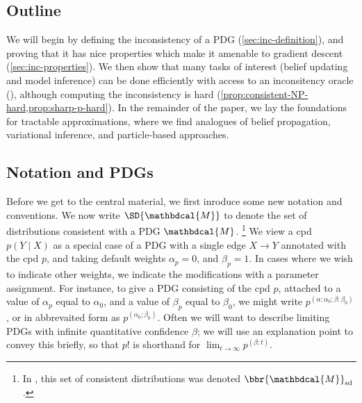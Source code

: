 \documentclass{article}
\theoremstyle{plain}
\theoremstyle{definition}
\theoremstyle{remark}
\newcommand{\dg}[1]{\mathbdcal{#1}}
\begin{document}



\subsection*{Outline}
We will begin by defining the inconsistency of a PDG (\cref{sec:inc-definition}), and proving that it has nice properties which make it amenable to gradient descent (\cref{sec:inc-properties}). We then show that many tasks of interest (belief updating and model inference) can be done efficiently with access to an inconsitency oracle (), although computing the inconsistency is hard (\cref{prop:consistent-NP-hard,prop:sharp-p-hard}).
In the remainder of the paper, we lay the foundations for tractable approximations, where we find analogues of belief propagation, variational inference, and particle-based approaches.


\subsection*{Notation and PDGs}


\begin{defn}
	
\end{defn}


Before we get to the central material, we first inroduce some new notation and conventions. We now write $\SD{\dg M}$ to denote
the set of distributions consistent with a PDG $\dg M$.%
	\footnote{In \cite{richardson2020probabilistic}, this set of consistent distributions was denoted $\bbr{\dg M}_{\textrm{sd}}$.}
We view a cpd $p(Y \mid X)$ as a special case of a PDG with
a single edge $X \to Y$ annotated with the cpd $p$, and taking
default weights $\alpha_p = 0$, and $\beta_p = 1$. In cases where we wish
to indicate other weights, we indicate the modifications with a parameter
assignment. For instance, to give a PDG consisting of the cpd $p$, attached to
a value of $\alpha_p$ equal to $\alpha_0$, and
a value of $\beta_p$ equal to $\beta_0$, we might write
$ p^{(\alpha:\alpha_0;\beta : \beta_0)} $, or in abbrevaited form as $p^{(\alpha_0;\beta_0)}$.
Often we will want to describe limiting PDGs with infinite quantitative confidence $\beta$; we will use an explanation point to convey this briefly, so that $p!$ is shorthand for
$\displaystyle\lim_{t \to \infty} p^{(\beta:t)}$.
%
\end{document}
